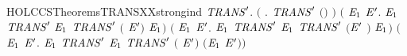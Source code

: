 \newcommand{\HOLCCSTheoremsTRANSXXrules}{\UseVerbatim{HOLCCSTheoremsTRANSXXrules}}
\begin{SaveVerbatim}{HOLCCSTheoremsTRANSXXstrongind}
\HOLTokenTurnstile{} \HOLSymConst{\HOLTokenForall{}}\ensuremath{\HOLBoundVar{TRANS}\sp{\prime{}}}.
     \ensuremath{(}\HOLSymConst{\HOLTokenForall{}} . \ensuremath{\HOLBoundVar{TRANS}\sp{\prime{}}} \ensuremath{(}\HOLSymConst{\ensuremath{\ldotp}}\ensuremath{)}  \ensuremath{)} \HOLSymConst{\HOLTokenConj{}}
     \ensuremath{(}\HOLSymConst{\HOLTokenForall{}}  \ensuremath{\HOLBoundVar{E}\sb{\mathrm{1}}} \ensuremath{\HOLBoundVar{E}\sp{\prime{}}}.
         \HOLTokenTransBegin{}\HOLTokenTransEnd \ensuremath{\HOLBoundVar{E}\sb{\mathrm{1}}} \HOLSymConst{\HOLTokenConj{}} \ensuremath{\HOLBoundVar{TRANS}\sp{\prime{}}}   \ensuremath{\HOLBoundVar{E}\sb{\mathrm{1}}} \HOLSymConst{\HOLTokenImp{}} \ensuremath{\HOLBoundVar{TRANS}\sp{\prime{}}} \ensuremath{(} \HOLSymConst{\ensuremath{+}} \ensuremath{\HOLBoundVar{E}\sp{\prime{}}}\ensuremath{)}  \ensuremath{\HOLBoundVar{E}\sb{\mathrm{1}}}\ensuremath{)} \HOLSymConst{\HOLTokenConj{}}
     \ensuremath{(}\HOLSymConst{\HOLTokenForall{}}  \ensuremath{\HOLBoundVar{E}\sb{\mathrm{1}}} \ensuremath{\HOLBoundVar{E}\sp{\prime{}}}.
         \HOLTokenTransBegin{}\HOLTokenTransEnd \ensuremath{\HOLBoundVar{E}\sb{\mathrm{1}}} \HOLSymConst{\HOLTokenConj{}} \ensuremath{\HOLBoundVar{TRANS}\sp{\prime{}}}   \ensuremath{\HOLBoundVar{E}\sb{\mathrm{1}}} \HOLSymConst{\HOLTokenImp{}} \ensuremath{\HOLBoundVar{TRANS}\sp{\prime{}}} \ensuremath{(}\ensuremath{\HOLBoundVar{E}\sp{\prime{}}} \HOLSymConst{\ensuremath{+}} \ensuremath{)}  \ensuremath{\HOLBoundVar{E}\sb{\mathrm{1}}}\ensuremath{)} \HOLSymConst{\HOLTokenConj{}}
     \ensuremath{(}\HOLSymConst{\HOLTokenForall{}}  \ensuremath{\HOLBoundVar{E}\sb{\mathrm{1}}} \ensuremath{\HOLBoundVar{E}\sp{\prime{}}}.
         \HOLTokenTransBegin{}\HOLTokenTransEnd \ensuremath{\HOLBoundVar{E}\sb{\mathrm{1}}} \HOLSymConst{\HOLTokenConj{}} \ensuremath{\HOLBoundVar{TRANS}\sp{\prime{}}}   \ensuremath{\HOLBoundVar{E}\sb{\mathrm{1}}} \HOLSymConst{\HOLTokenImp{}} \ensuremath{\HOLBoundVar{TRANS}\sp{\prime{}}} \ensuremath{(} \HOLSymConst{\ensuremath{\mid}} \ensuremath{\HOLBoundVar{E}\sp{\prime{}}}\ensuremath{)}  \ensuremath{(}\ensuremath{\HOLBoundVar{E}\sb{\mathrm{1}}} \HOLSymConst{\ensuremath{\mid}} \ensuremath{\HOLBoundVar{E}\sp{\prime{}}}\ensuremath{)}\ensuremath{)} \HOLSymConst{\HOLTokenConj{}}

\end{SaveVerbatim}
